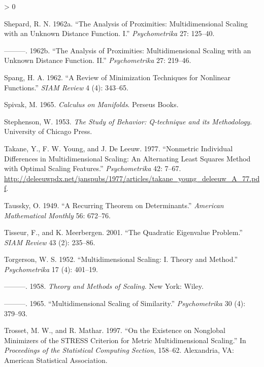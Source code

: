 \documentclass[
  12pt,
]{book}
\newlength{\cslhangindent}
\newenvironment{CSLReferences}[2] %
 {%
  \setlength{\parindent}{0pt}
  \ifodd #1 \everypar{\setlength{\hangindent}{\cslhangindent}}\ignorespaces\fi
  \ifnum #2 > 0
  \setlength{\parskip}{#2\baselineskip}
  \fi
 }%
 {}
\theoremstyle{definition}
\theoremstyle{definition}
\theoremstyle{definition}
\theoremstyle{definition}
\theoremstyle{remark}
\begin{document}
\begin{CSLReferences}{1}{0}
\leavevmode\hypertarget{ref-shepard_62a}{}%
Shepard, R. N. 1962a. {``{The Analysis of Proximities: Multidimensional Scaling with an Unknown Distance Function. I}.''} \emph{Psychometrika} 27: 125--40.

\leavevmode\hypertarget{ref-shepard_62b}{}%
---------. 1962b. {``{The Analysis of Proximities: Multidimensional Scaling with an Unknown Distance Function. II}.''} \emph{Psychometrika} 27: 219--46.

\leavevmode\hypertarget{ref-spang_62}{}%
Spang, H. A. 1962. {``{A Review of Minimization Techniques for Nonlinear Functions}.''} \emph{SIAM Review} 4 (4): 343--65.

\leavevmode\hypertarget{ref-spivak_65}{}%
Spivak, M. 1965. \emph{Calculus on Manifolds}. Perseus Books.

\leavevmode\hypertarget{ref-stephenson_53}{}%
Stephenson, W. 1953. \emph{{The Study of Behavior: Q-technique and its Methodology}}. University of Chicago Press.

\leavevmode\hypertarget{ref-takane_young_deleeuw_A_77}{}%
Takane, Y., F. W. Young, and J. De Leeuw. 1977. {``Nonmetric Individual Differences in Multidimensional Scaling: An Alternating Least Squares Method with Optimal Scaling Features.''} \emph{Psychometrika} 42: 7--67. \url{http://deleeuwpdx.net/janspubs/1977/articles/takane_young_deleeuw_A_77.pdf}.

\leavevmode\hypertarget{ref-taussky_49}{}%
Taussky, O. 1949. {``{A Recurring Theorem on Determinants}.''} \emph{American Mathematical Monthly} 56: 672--76.

\leavevmode\hypertarget{ref-tisseur_meerbergen_01}{}%
Tisseur, F., and K. Meerbergen. 2001. {``{The Quadratic Eigenvalue Problem}.''} \emph{{SIAM} Review} 43 (2): 235--86.

\leavevmode\hypertarget{ref-torgerson_52}{}%
Torgerson, W. S. 1952. {``{Multidimensional Scaling: I. Theory and Method}.''} \emph{Psychometrika} 17 (4): 401--19.

\leavevmode\hypertarget{ref-torgerson_58}{}%
---------. 1958. \emph{{Theory and Methods of Scaling}}. New York: Wiley.

\leavevmode\hypertarget{ref-torgerson_65}{}%
---------. 1965. {``{Multidimensional Scaling of Similarity}.''} \emph{Psychometrika} 30 (4): 379--93.

\leavevmode\hypertarget{ref-trosset_mathar_97}{}%
Trosset, M. W., and R. Mathar. 1997. {``{On the Existence on Nonglobal Minimizers of the STRESS Criterion for Metric Multidimensional Scaling}.''} In \emph{Proceedings of the Statistical Computing Section}, 158--62. Alexandria, VA: American Statistical Association.


\end{CSLReferences}
\end{document}

